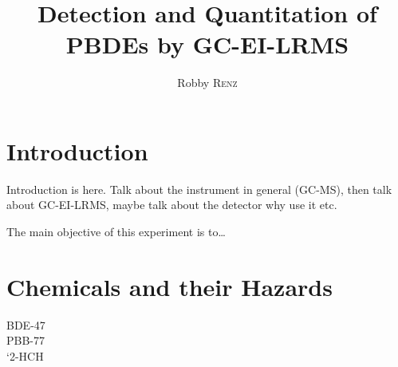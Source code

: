 \documentclass[a4paper, 12pt]{article}
\title{Detection and Quantitation of PBDEs by GC-EI-LRMS}
\author{Robby \textsc{Renz}}
\begin{document}
\maketitle

\section{Introduction}
Introduction is here. Talk about the instrument in general (GC-MS), then talk about GC-EI-LRMS, maybe talk about the detector why use it etc.

The main objective of this experiment is to\dots

\section{Chemicals and their Hazards}

\begin{description}
	\item[BDE-47]
	\item[PBB-77]
	\item[`2-HCH]
\end{description}

\printbibliography
\end{document}

